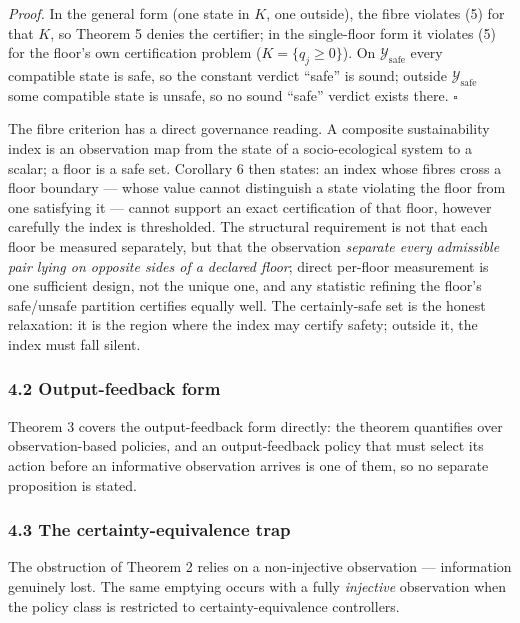 \documentclass[11pt]{article}
\begin{document}
\emph{Proof.} In the general form (one state in \(K\), one outside), the
fibre violates (5) for that \(K\), so Theorem 5 denies the certifier; in
the single-floor form it violates (5) for the floor's own certification
problem (\(K = \{q_j \ge 0\}\)). On \(\mathcal{Y}_{\mathrm{safe}}\)
every compatible state is safe, so the constant verdict ``safe'' is
sound; outside \(\mathcal{Y}_{\mathrm{safe}}\) some compatible state is
unsafe, so no sound ``safe'' verdict exists there. \ensuremath{\square}

The fibre criterion has a direct governance reading. A composite
sustainability index is an observation map from the state of a
socio-ecological system to a scalar; a floor is a safe set. Corollary 6
then states: an index whose fibres cross a floor boundary --- whose
value cannot distinguish a state violating the floor from one satisfying
it --- cannot support an exact certification of that floor, however
carefully the index is thresholded. The structural requirement is not
that each floor be measured separately, but that the observation
\emph{separate every admissible pair lying on opposite sides of a
declared floor}; direct per-floor measurement is one sufficient design,
not the unique one, and any statistic refining the floor's safe/unsafe
partition certifies equally well. The certainly-safe set is the honest
relaxation: it is the region where the index may certify safety; outside
it, the index must fall silent.

\subsubsection{4.2 Output-feedback form}\label{output-feedback-form}

Theorem 3 covers the output-feedback form directly: the theorem
quantifies over observation-based policies, and an output-feedback
policy that must select its action before an informative observation
arrives is one of them, so no separate proposition is stated.

\subsubsection{4.3 The certainty-equivalence
trap}\label{the-certainty-equivalence-trap}

The obstruction of Theorem 2 relies on a non-injective observation ---
information genuinely lost. The same emptying occurs with a fully
\emph{injective} observation when the policy class is restricted to
certainty-equivalence controllers.
\end{document}
